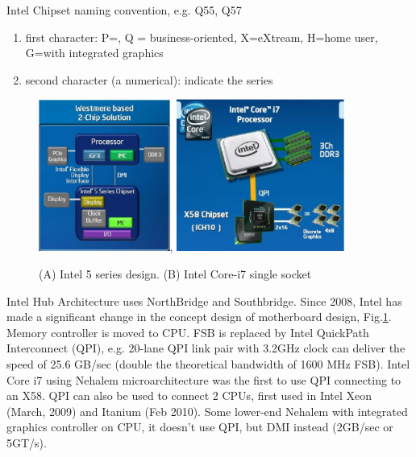 \begin{framed}
Intel Chipset naming convention, e.g. Q55, Q57 
\begin{enumerate}
  \item first character: P=, Q = business-oriented, X=eXtream, H=home user,
  G=with integrated graphics
  \item second character (a numerical): indicate the series
\end{enumerate}
\end{framed}

\begin{figure}[hbt]
  \centerline{
  \includegraphics[height=5cm,
    angle=0]{./images/Intel_series5.eps},
    \includegraphics[height=5cm,
    angle=0]{./images/Intel_Core-i7.eps}}
\caption{(A) Intel 5 series design. (B) Intel Core-i7 single socket}
\label{fig:Intel_i5}
\end{figure}

Intel Hub Architecture uses NorthBridge and Southbridge. Since 2008, Intel has
made a significant change in the concept design of motherboard design,
Fig.\ref{fig:Intel_i5}. Memory controller is moved to CPU. FSB is replaced
by Intel QuickPath Interconnect (QPI), e.g. 20-lane QPI link pair with 3.2GHz clock
can deliver the speed of 25.6 GB/sec (double the theoretical bandwidth of 1600
MHz FSB). Intel Core i7 using Nehalem microarchitecture was the first
to use QPI connecting to an X58. QPI can also be used to connect 2 CPUs, first
used in Intel Xeon (March, 2009) and Itanium (Feb 2010). Some lower-end Nehalem
with integrated graphics controller on CPU, it doesn't use QPI, but
DMI instead (2GB/sec or 5GT/s).

